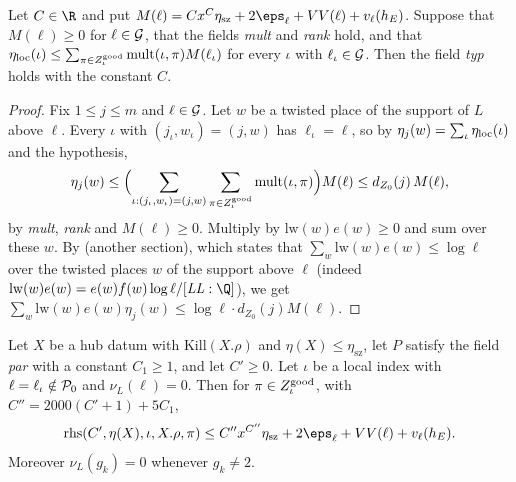 \begin{lemma}\label{pf:linkN-sel:starHlocal}
Let $C\in\R$ and put $M(\ell)=Cx^C\eta_{\mathrm{sz}}+2\eps_\ell+VV(\ell)+v_\ell(h_E)$. Suppose that $M(\ell)\ge0$ for $\ell\in\mathcal G$, that
the fields \emph{mult} and \emph{rank} hold, and that $\eta_{\mathrm{loc}}(\iota)\le\sum_{\pi\in Z^{\mathrm{good}}_\iota}\mathrm{mult}(\iota,\pi)M(\ell_\iota)$
for every $\iota$ with $\ell_\iota\in\mathcal G$. Then the field \emph{typ} holds with the constant $C$.
\end{lemma}

\begin{proof}
Fix $1\le j\le m$ and $\ell\in\mathcal G$. Let $w$ be a twisted place of the support of $L$ above $\ell$. Every $\iota$ with
$(j_\iota,w_\iota)=(j,w)$ has $\ell_\iota=\ell$, so by $\eta_j(w)=\sum_\iota\eta_{\mathrm{loc}}(\iota)$ and the hypothesis,
\[
\eta_j(w)\le\Bigl(\sum_{\iota:(j_\iota,w_\iota)=(j,w)}\sum_{\pi\in Z^{\mathrm{good}}_\iota}\mathrm{mult}(\iota,\pi)\Bigr)M(\ell)\le d_{Z_0}(j)\,M(\ell),
\]
by \emph{mult}, \emph{rank} and $M(\ell)\ge0$. Multiply by $\mathrm{lw}(w)e(w)\ge0$ and sum over these $w$. By
 (another section), which states that
$\sum_{w}\mathrm{lw}(w)e(w)\le\log\ell$ over the twisted places $w$ of the support above $\ell$ (indeed
$\mathrm{lw}(w)e(w)=e(w)f(w)\log\ell/[\mathit{LL}:\Q]$), we get $\sum_w\mathrm{lw}(w)e(w)\eta_j(w)\le\log\ell\cdot d_{Z_0}(j)M(\ell)$.
\end{proof}

\begin{lemma}\label{pf:linkN-sel:rhsle}
Let $X$ be a hub datum with $\mathrm{Kill}(X.\rho)$ and $\eta(X)\le\eta_{\mathrm{sz}}$, let $P$ satisfy the field \emph{par} with a constant
$C_1\ge1$, and let $C'\ge0$. Let $\iota$ be a local index with $\ell=\ell_\iota\notin\mathcal P_0$ and $\nu_L(\ell)=0$. Then for
$\pi\in Z^{\mathrm{good}}_\iota$, with $C''=2000(C'+1)+5C_1$,
\[
\mathrm{rhs}(C',\eta(X),\iota,X.\rho,\pi)\le C''x^{C''}\eta_{\mathrm{sz}}+2\eps_\ell+VV(\ell)+v_\ell(h_E).
\]
Moreover $\nu_L(g_k)=0$ whenever $g_k\ne2$.
\end{lemma}

